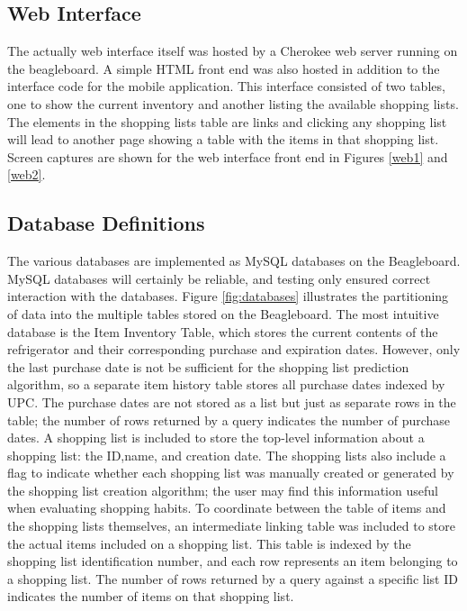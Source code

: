 \documentclass[11pt]{article} %
\begin{document}
\subsection{Web Interface}
The actually web interface itself was hosted by a Cherokee web server running on the beagleboard. A simple HTML front end was also hosted in addition to the interface code for the mobile application. This interface consisted of two tables, one to show the current inventory and another listing the available shopping lists. The elements in the shopping lists table are links and clicking any shopping list will lead to another page showing a table with the items in that shopping list. Screen captures are shown for the web interface front end in Figures \ref{web1} and \ref{web2}.

\subsection{Database Definitions}
The various databases are implemented as MySQL databases on the Beagleboard. MySQL databases will certainly be reliable, and testing only ensured correct interaction with the databases. Figure \ref{fig:databases} illustrates the partitioning of data into the multiple tables stored on the Beagleboard. The most intuitive database is the Item Inventory Table, which stores the current contents of the refrigerator and their corresponding purchase and expiration dates. However, only the last purchase date is not be sufficient for the shopping list prediction algorithm, so a separate item history table stores all purchase dates indexed by UPC. The purchase dates are not stored as a list but just as separate rows in the table; the number of rows returned by a query indicates the number of purchase dates. A shopping list is included to store the top-level information about a shopping list: the ID,name, and creation date. The shopping lists also include a flag to indicate whether each shopping list was manually created or generated by the shopping list creation algorithm; the user may find this information useful when evaluating shopping habits. To coordinate between the table of items and the shopping lists themselves, an intermediate linking table was included to store the actual items included on a shopping list. This table is indexed by the shopping list identification number, and each row represents an item belonging to a shopping list. The number of rows returned by a query against a specific list ID indicates the number of items on that shopping list.
\end{document}
